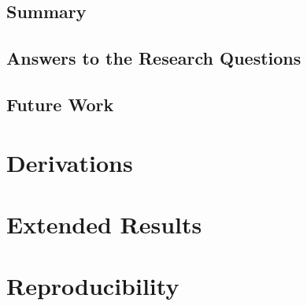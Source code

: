 \documentclass[headsepline,footsepline,footinclude=false,oneside,fontsize=11pt,paper=a4,listof=totoc,bibliography=totoc]{scrbook}
\begin{document}
\section{Summary}\label{sec:concl:summary}
\section{Answers to the Research Questions}\label{sec:concl:answers}
\section{Future Work}\label{sec:concl:future}

\appendix{}

\chapter{Derivations}\label{app:derivations}

\chapter{Extended Results}\label{app:results}

\chapter{Reproducibility}\label{app:repro}

\end{document}
